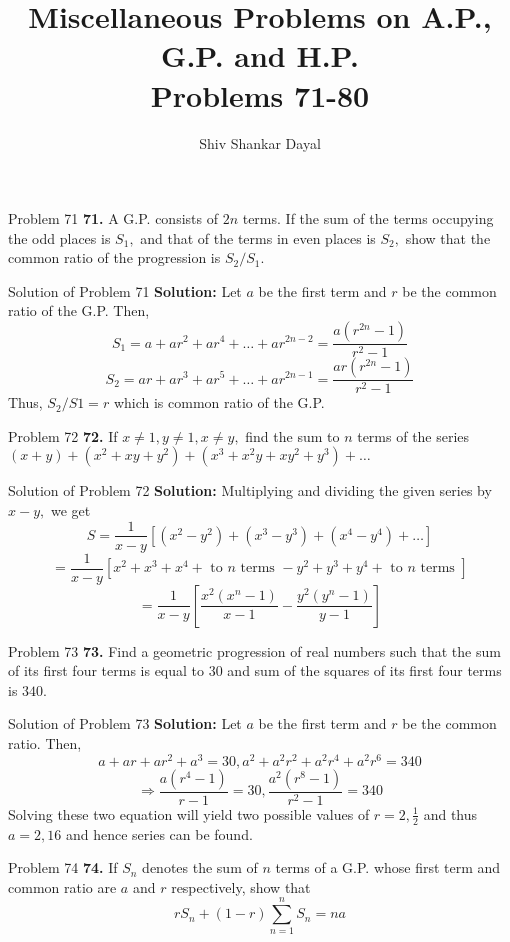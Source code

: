 \documentclass[aspectratio=1610,8pt]{beamer}
\title{Miscellaneous Problems on A.P., G.P. and H.P.\\Problems 71-80}
\author[Shiv Shankar Dayal]{Shiv Shankar Dayal}
\begin{document}
\begin{frame}
  \titlepage
\end{frame}
\begin{frame}{Problem 71}
  \textbf{71.} A G.P. consists of $2n$ terms. If the sum of the terms occupying the odd places is $S_1,$ and that of the terms in
  even places is $S_2,$ show that the common ratio of the progression is $S_2/S_1.$
\end{frame}
\begin{frame}{Solution of Problem 71}
  \textbf{Solution:} Let $a$ be the first term and $r$ be the common ratio of the G.P. Then,
  $$S_1 = a + ar^2 + ar^4 + \ldots + ar^{2n - 2} = \frac{a(r^{2n} - 1)}{r^2 - 1}$$
  $$S_2 = ar + ar^3 + ar^5 + \ldots + ar^{2n - 1} = \frac{ar(r^{2n} - 1)}{r^2 - 1}$$
  Thus, $S_2/S1 = r$ which is common ratio of the G.P.
\end{frame}
\begin{frame}{Problem 72}
  \textbf{72.} If $x\neq 1, y\neq 1, x \neq y,$ find the sum to $n$ terms of the series $(x + y) + (x^2 + xy + y^2) + (x^3 + x^2y +
  xy^2 + y^3) + \ldots$
\end{frame}
\begin{frame}{Solution of Problem 72}
  \textbf{Solution:} Multiplying and dividing the given series by $x - y,$ we get
  $$S = \frac{1}{x - y}\left[(x^2 - y^2) + (x^3 - y^3) + (x^4 - y^4) + \ldots\right]$$
  $$= \frac{1}{x - y}\left[x^2 + x^3 + x^4+ \text{~to~}n\text{~terms~} - y^2 + y^3 + y^4+ \text{~to~}n\text{~terms~}\right]$$
  $$= \frac{1}{x - y}\left[\frac{x^2(x^n - 1)}{x - 1} - \frac{y^2(y^n - 1)}{y - 1}\right]$$
\end{frame}
\begin{frame}{Problem 73}
  \textbf{73.} Find a geometric progression of real numbers such that the sum of its first four terms is equal to $30$ and sum of
  the squares of its first four terms is $340.$
\end{frame}
\begin{frame}{Solution of Problem 73}
  \textbf{Solution:} Let $a$ be the first term and $r$ be the common ratio. Then,
  $$a + ar + ar^2 + a^3 = 30, a^2 + a^2r^2 + a^2r^4 + a^2r^6 = 340$$
  $$\Rightarrow \frac{a(r^4 - 1)}{r - 1} = 30, \frac{a^2(r^8 - 1)}{r^2 - 1} = 340$$
  Solving these two equation will yield two possible values of $r = 2, \frac{1}{2}$ and thus $a = 2, 16$ and hence series can be found.
\end{frame}
\begin{frame}{Problem 74}
  \textbf{74.} If $S_n$ denotes the sum of $n$ terms of a G.P. whose first term and common ratio are $a$ and $r$ respectively, show
  that $$rS_n + (1 - r)\sum_{n = 1}^nS_n = na$$
\end{frame}
\end{document}
